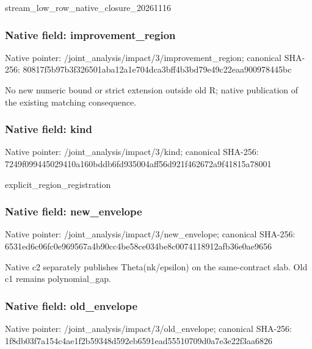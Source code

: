 \documentclass[10pt,a4paper]{article}
\begin{document}
\begingroup\raggedright\sloppy stream\_\allowbreak{}low\_\allowbreak{}row\_\allowbreak{}native\_\allowbreak{}closure\_\allowbreak{}20261116\par\endgroup

\subsubsection{Native field: improvement\_\allowbreak{}region}
Native pointer: /joint\_\allowbreak{}analysis/impact/3/improvement\_\allowbreak{}region; canonical SHA-256: 80817f5b97b3f326501aba12a1e704dca3bff4b3bd79e49c22eaa900978445bc

\begingroup\raggedright\sloppy No new numeric bound or strict extension outside old R;\allowbreak{} native publication of the existing matching consequence.\par\endgroup

\subsubsection{Native field: kind}
Native pointer: /joint\_\allowbreak{}analysis/impact/3/kind; canonical SHA-256: 7249f099445029410a160bddb6fd935004aff56d921f462672a9f41815a78001

\begingroup\raggedright\sloppy explicit\_\allowbreak{}region\_\allowbreak{}registration\par\endgroup

\subsubsection{Native field: new\_\allowbreak{}envelope}
Native pointer: /joint\_\allowbreak{}analysis/impact/3/new\_\allowbreak{}envelope; canonical SHA-256: 6531ed6c06fc0e969567a4b90cc4be58ce034be8c0074118912afb36e0ae9656

\begingroup\raggedright\sloppy Native c2 separately publishes Theta(nk/\allowbreak{}epsilon) on the same-contract slab. Old c1 remains polynomial\_\allowbreak{}gap.\par\endgroup

\subsubsection{Native field: old\_\allowbreak{}envelope}
Native pointer: /joint\_\allowbreak{}analysis/impact/3/old\_\allowbreak{}envelope; canonical SHA-256: 1f8db03f7a154c4ae1f2b59348d592eb6591ead55510709d0a7e3e22f3aa6826
\end{document}

